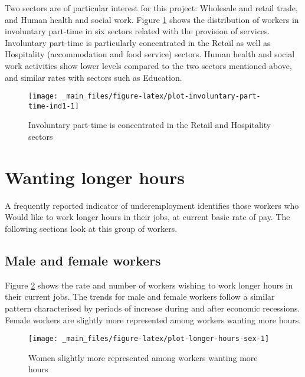 \documentclass[
]{book}
\begin{document}
Two sectors are of particular interest for this project: Wholesale and retail trade, and Human health and social work. Figure \ref{fig:plot-involuntary-part-time-ind1} shows the distribution of workers in involuntary part-time in six sectors related with the provision of services. Involuntary part-time is particularly concentrated in the Retail as well as Hospitality (accommodation and food service) sectors. Human health and social work activities show lower levels compared to the two sectors mentioned above, and similar rates with sectors such as Education.

\begin{figure}

{\centering \texttt{[image: \_main\_files/figure-latex/plot-involuntary-part-time-ind1-1]} 

}

\caption{Involuntary part-time is concentrated in the Retail and Hospitality sectors}\label{fig:plot-involuntary-part-time-ind1}
\end{figure}

\hypertarget{wanting-longer-hours}{%
\section{Wanting longer hours}\label{wanting-longer-hours}}

A frequently reported indicator of underemployment identifies those workers who Would like to work longer hours in their jobs, at current basic rate of pay. The following sections look at this group of workers.

\hypertarget{male-and-female-workers-1}{%
\subsection{Male and female workers}\label{male-and-female-workers-1}}

Figure \ref{fig:plot-longer-hours-sex} shows the rate and number of workers wishing to work longer hours in their current jobs. The trends for male and female workers follow a similar pattern characterised by periods of increase during and after economic recessions. Female workers are slightly more represented among workers wanting more hours.

\begin{figure}

{\centering \texttt{[image: \_main\_files/figure-latex/plot-longer-hours-sex-1]} 

}

\caption{Women slightly more represented among workers wanting more hours}\label{fig:plot-longer-hours-sex}
\end{figure}
\end{document}
